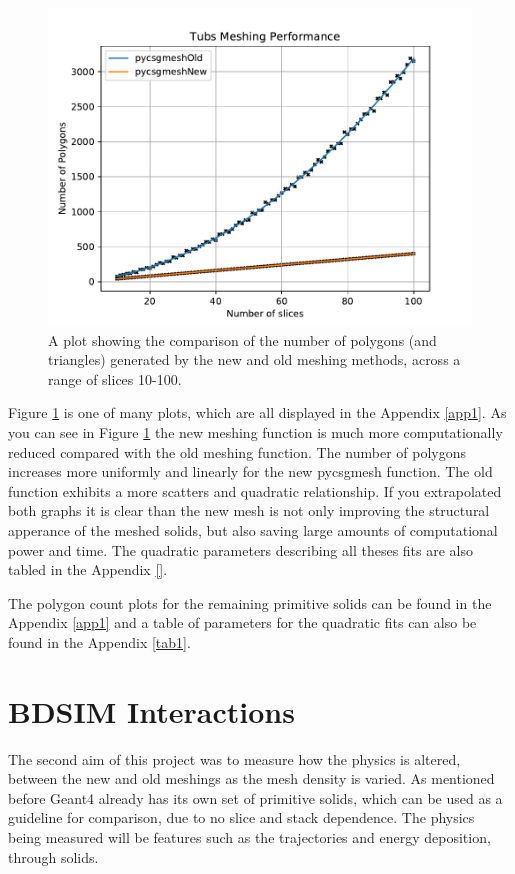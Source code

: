 \documentclass[12pt,a4paper]{article}
\begin{document}
\begin{figure}[h!]
\centering
\includegraphics[scale=0.6]{Images//Quad_fits//Tubs_quad.pdf}
\caption[width=\columnwidth]{A plot showing the comparison of the number of polygons (and triangles) generated by the new and old meshing methods, across a range of slices 10-100.}
\label{conts}
\end{figure}

\noindent Figure \ref{conts} is one of many plots, which are all displayed in the Appendix \ref{app1}. As you can see in Figure \ref{conts} the new meshing function is much more computationally reduced compared with the old meshing function. The number of polygons increases more uniformly and linearly for the new pycsgmesh function. The old function exhibits a more scatters and quadratic relationship. If you extrapolated both graphs it is clear than the new mesh is not only improving the structural apperance of the meshed solids, but also saving large amounts of computational power and time. The quadratic parameters describing all theses fits are also tabled in the Appendix \ref{}.

\noindent The polygon count plots for the remaining primitive solids can be found in the Appendix \ref{app1} and a table of parameters for the quadratic fits can also be found in the Appendix \ref{tab1}. 

\newpage
\section{BDSIM Interactions}
\label{int}
The second aim of this project was to measure how the physics is altered, between the new and old meshings as the mesh density is varied. As mentioned before Geant4 already has its own set of primitive solids, which can be used as a guideline for comparison, due to no slice and stack dependence. The physics being measured will be features such as the trajectories and energy deposition, through solids.
\end{document}
